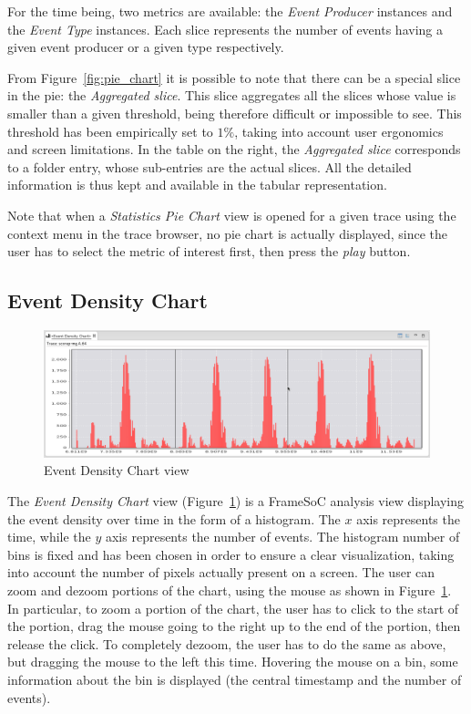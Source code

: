 \documentclass[twoside]{article}
\begin{document}
\begin{sloppypar}
For the time being, two metrics are available: the \emph{Event Producer} instances and the \emph{Event Type} instances. 
Each slice represents the number of events having a given event producer or a given type respectively.

From Figure~\ref{fig:pie_chart} it is possible to note that there can be a special slice in the pie: the \emph{Aggregated slice}.
This slice aggregates all the slices whose value is smaller than a given threshold, being therefore difficult or impossible to see.
This threshold has been empirically set to $1\%$, taking into account user ergonomics and screen limitations.
In the table on the right, the \emph{Aggregated slice} corresponds to a folder entry, whose sub-entries are the actual slices.
All the detailed information is thus kept and available in the tabular representation.

Note that when a \emph{Statistics Pie Chart} view is opened for a given trace using the context menu in the trace browser, no pie chart is actually displayed, since the user has to select the metric of interest first, then press the \emph{play} button.

\subsection{Event Density Chart}
\label{subsec:histogram}

\begin{figure}[h!]
  \centering
    \includegraphics[width=1.0\textwidth]{images/histogram_zoom.png}
  \caption{Event Density Chart view}
  \label{fig:histogram_zoom}
\end{figure}

The \emph{Event Density Chart} view (Figure~\ref{fig:histogram_zoom}) is a FrameSoC analysis view displaying the event density over time in the form of a histogram.
The $x$ axis represents the time, while the $y$ axis represents the number of events.
The histogram number of bins is fixed and has been chosen in order to ensure a clear visualization, taking into account the number of pixels actually present on a screen. 
The user can zoom and dezoom portions of the chart, using the mouse as shown in Figure~\ref{fig:histogram_zoom}.
In particular, to zoom a portion of the chart, the user has to click to the start of the portion, drag the mouse going to the right up to the end of the portion, then release the click.
To completely dezoom, the user has to do the same as above, but dragging the mouse to the left this time.
Hovering the mouse on a bin, some information about the bin is displayed (the central timestamp and the number of events).


\end{sloppypar}
\end{document}
